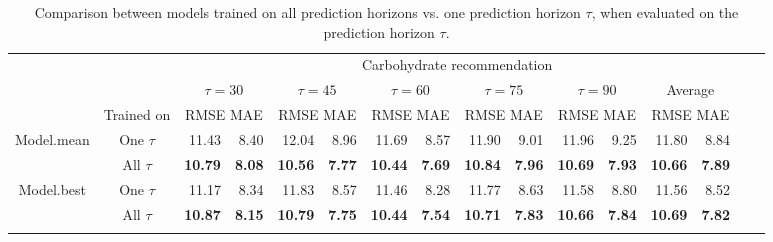 \documentclass[graybox]{svmult}
\begin{document}
\begin{table}\setlength{\tabcolsep}{1.75pt}
\caption{Comparison between models trained on all prediction horizons vs. one prediction horizon $\tau$, when evaluated on the prediction horizon $\tau$.}
\begin{center}
\label{tab:time_transfer}
\begin{tabular}{|c|c|rr|rr|rr|rr|rr|rr|rr}
    \cline{3-14}
    \multicolumn{2}{c|}{} & \multicolumn{12}{c|}{Carbohydrate recommendation}\\
    \cline{3-14}
    \multicolumn{2}{c|}{} & \multicolumn{2}{c|}{$\tau=30$} & \multicolumn{2}{c|}{$\tau=45$} & \multicolumn{2}{c|}{$\tau=60$} & \multicolumn{2}{c|}{$\tau=75$} & \multicolumn{2}{c|}{$\tau=90$} & \multicolumn{2}{c|}{Average}\\
    \cline{2-14}
     \multicolumn{1}{c|}{}& Trained on & \multicolumn{2}{c|}{\scriptsize RMSE MAE} & \multicolumn{2}{c|}{\scriptsize RMSE MAE} & \multicolumn{2}{c|}{\scriptsize RMSE MAE} & \multicolumn{2}{c|}{\scriptsize RMSE MAE} & \multicolumn{2}{c|}{\scriptsize RMSE MAE} & \multicolumn{2}{c|}{\scriptsize RMSE MAE} \\
    \hline
    \multirow{2}{*}{Model.mean} & One $\tau$ & 11.43 & 8.40 & 12.04 & 8.96 & 11.69 & 8.57 & 11.90 & 9.01 & 11.96 & 9.25 & 11.80 & 8.84\\
    & All $\tau$ & \textbf{10.79} & \textbf{8.08} & \textbf{10.56} & \textbf{7.77} & \textbf{10.44} & \textbf{7.69} & \textbf{10.84} & \textbf{7.96} & \textbf{10.69} & \textbf{7.93} & \textbf{10.66} & \textbf{7.89}\\
    \hline
    \multirow{2}{*}{Model.best} & One $\tau$ & 11.17 & 8.34 & 11.83 & 8.57 & 11.46 & 8.28 & 11.77 & 8.63 & 11.58 & 8.80 & 11.56 & 8.52\\
    & All $\tau$ & \textbf{10.87} & \textbf{8.15} & \textbf{10.79} & \textbf{7.75} & \textbf{10.44} & \textbf{7.54} & \textbf{10.71} & \textbf{7.83} & \textbf{10.66} & \textbf{7.84} & \textbf{10.69} & \textbf{7.82}\\
    \hline
    
    \multicolumn{14}{c}{}\\[-1.5ex]


\end{tabular}
\end{center}
\end{table}
\end{document}
